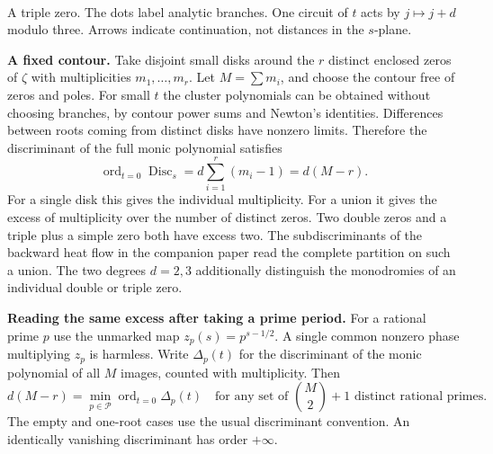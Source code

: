 \documentclass[11pt,a4paper]{article}
\newcommand{\ord}{\operatorname{ord}}
\newcommand{\Disc}{\operatorname{Disc}}
\begin{document}
\begin{center}
\\
{\small A triple zero. The dots label analytic branches. One circuit of $t$ acts by $j\mapsto j+d$
modulo three. Arrows indicate continuation, not distances in the $s$-plane.}
\end{center}

\newpage
\textbf{A fixed contour.} Take disjoint small disks around the $r$ distinct enclosed zeros of $\zeta$ with
multiplicities $m_1,\ldots,m_r$. Let $M=\sum m_i$, and choose the contour free of zeros and poles. For small
$t$ the cluster polynomials can be obtained without choosing branches, by contour power sums and Newton's
identities. Differences between roots coming from distinct disks have nonzero limits. Therefore the discriminant
of the full monic polynomial satisfies
\[
 \ord_{t=0}\Disc_s=d\sum_{i=1}^r(m_i-1)=d(M-r).
\]
For a single disk this gives the individual multiplicity. For a union it gives the excess of multiplicity over the
number of distinct zeros. Two double zeros and a triple plus a simple zero both have excess two. The subdiscriminants
of the backward heat flow in the companion paper read the complete partition on such a union. The two degrees
$d=2,3$ additionally distinguish the monodromies of an individual double or triple zero.

\textbf{Reading the same excess after taking a prime period.} For a rational prime $p$ use the unmarked map
$z_p(s)=p^{s-1/2}$. A single common nonzero phase multiplying $z_p$ is harmless.
Write $\Delta_p(t)$ for the discriminant of the monic polynomial of all $M$ images, counted with multiplicity.
Then
\[
 d(M-r)=\min_{p\in\mathcal P}\ord_{t=0}\Delta_p(t)
 \quad\text{for any set of }\binom M2+1\text{ distinct rational primes}.
\]
The empty and one-root cases use the usual discriminant convention. An identically vanishing discriminant has
order $+\infty$.
\end{document}
